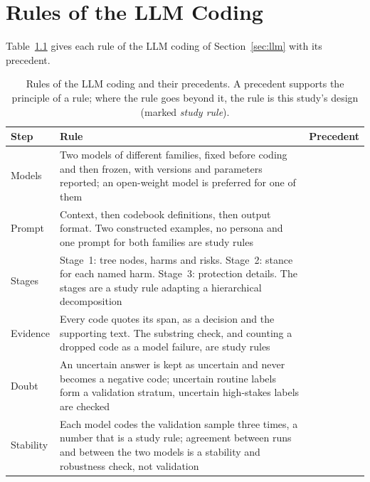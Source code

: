 \chapter{Rules of the LLM Coding}
\label{app:prompts}
\label{app:llm-rules}
Table~\ref{tab:llm-steps} gives each rule of the LLM coding of Section~\ref{sec:llm} with its
precedent.

\begin{table}[H]
\centering
\begin{singlespace}
\caption[Rules of the LLM coding and their precedents]{Rules of the LLM coding and their
precedents. A precedent supports the principle of a rule; where the rule goes beyond it, the
rule is this study's design (marked \emph{study rule}).}
\label{tab:llm-steps}
\footnotesize
\begin{tabularx}{\textwidth}{@{}>{\raggedright\arraybackslash}p{2.1cm}>{\raggedright\arraybackslash}X>{\raggedright\arraybackslash}p{3.6cm}@{}}
\toprule
\textbf{Step} & \textbf{Rule} & \textbf{Precedent} \\
\midrule
Models & Two models of different families, fixed before coding and then frozen, with versions and parameters reported; an open-weight model is preferred for one of them
  & \parencite{tornberg2024best} \\
\cmidrule[0.3pt]{2-3}
Prompt & Context, then codebook definitions, then output format. Two constructed examples, no persona and one prompt for both families are study rules
  & \parencite[\S4.2, pp.~3886--3888]{rodriguez2024llm}\parencite{tornberg2024best} \\
\cmidrule[0.3pt]{2-3}
Stages & Stage~1: tree nodes, harms and risks. Stage~2: stance for each named harm. Stage~3: protection details. The stages are a study rule adapting a hierarchical decomposition
  & \parencite[\S4.3]{harkous2018polisis} \\
\cmidrule[0.3pt]{2-3}
Evidence & Every code quotes its span, as a decision and the supporting text. The substring check, and counting a dropped code as a model failure, are study rules
  & \parencite[App.~B]{xie2025evaluating} \\
\cmidrule[0.3pt]{2-3}
Doubt & An uncertain answer is kept as uncertain and never becomes a negative code; uncertain routine labels form a validation stratum, uncertain high-stakes labels are checked
  & \parencite{tornberg2024best} \\
\cmidrule[0.3pt]{2-3}
Stability & Each model codes the validation sample three times, a number that is a study rule; agreement between runs and between the two models is a stability and robustness check, not validation

\end{tabularx}
\end{singlespace}
\end{table}
